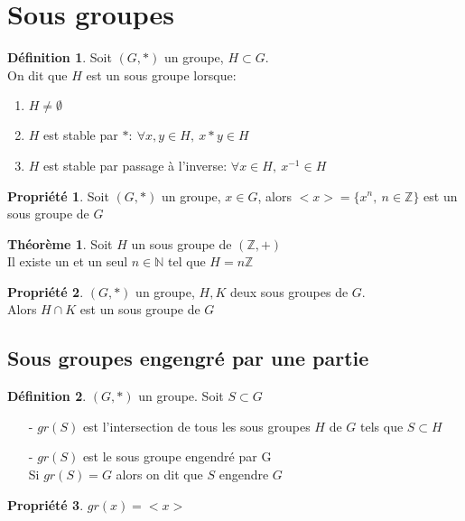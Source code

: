 \documentclass[fleqn]{article}
\theoremstyle{definition} \newtheorem*{defi}{D\'efinition}
\theoremstyle{definition} \newtheorem*{theo}{Th\'eor\`eme}
\theoremstyle{definition} \newtheorem*{coro}{Corollaire}
\theoremstyle{remark} \newtheorem*{rqs}{Remarques}
\theoremstyle{definition} \newtheorem*{prop}{Propri\'et\'e}
\begin{document}
\section{Sous groupes}
\begin{defi} Soit $(G,*)$ un groupe, $H \subset G$.\\
	On dit que $H$ est un sous groupe lorsque:
	\begin{enumerate}
		\item $H \neq \emptyset$
		\item $H$ est stable par $*:\ \forall x,y \in H,\ x*y \in H$
		\item $H$ est stable par passage \`a l'inverse: $\forall x \in H,\ x^{-1} \in H$
	\end{enumerate}
\end{defi}

\begin{prop}
	Soit $(G, *)$ un groupe, $x \in G$, alors $<x> = \{x^n,\ n \in \mathbb{Z}\}$ est un sous groupe de $G$
\end{prop}

\begin{theo}
Soit $H$ un sous groupe de $(\mathbb{Z}, +)$ \\
Il existe un et un seul $n \in \mathbb{N}$ tel que $H = n\mathbb{Z}$
\end{theo}

\begin{prop} $(G, *)$ un groupe, $H,K$ deux sous groupes de $G$.\\
Alors $H \cap K$ est un sous groupe de $G$
\end{prop}

\subsection{Sous groupes engengr\'e par une partie}
\begin{defi} $(G, *)$ un groupe. Soit $S \subset G$
	\begin{itemize}
		\item [-] $gr(S)$ est l'intersection de tous les sous groupes $H$ de $G$ tels que $S \subset H$
		\item [-] $gr(S)$ est le sous groupe engendr\'e par G\\
			Si $gr(S) = G$ alors on dit que $S$ engendre $G$
	\end{itemize}
\end{defi}

\begin{prop} $gr(x) = <x>$ \end{prop}
\end{document}

